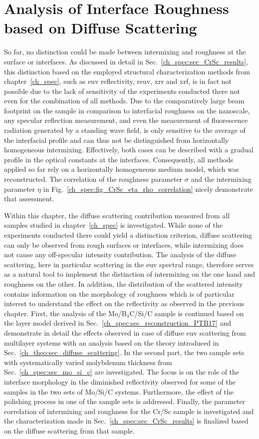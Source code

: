 \chapter{Analysis of Interface Roughness based on Diffuse Scattering} \label{ch_diff}
So far, no distinction could be made between intermixing and roughness at the surface or interfaces. As discussed in detail in Sec.~\ref{ch_spec:sec_CrSc_results}, this distinction based on the employed structural characterization methods from chapter~\ref{ch_spec}, such as \gls{euv} reflectivity, \gls{reuv}, \gls{xrr} and \gls{xrf}, is in fact not possible due to the lack of sensitivity of the experiments conducted there not even for the combination of all methods. Due to the comparatively large beam footprint on the sample in comparison to interfacial roughness on the nanoscale, any specular reflection measurement, and even the measurement of fluorescence radiation generated by a standing wave field, is only sensitive to the average of the interfacial profile and can thus not be distinguished from horizontally homogeneous intermixing. Effectively, both cases can be described with a gradual profile in the optical constants at the interfaces. Consequently, all methods applied so far rely on a horizontally homogeneous medium model, which was reconstructed. The correlation of the roughness parameter $\sigma$ and the intermixing parameter $\eta$ in Fig.~\ref{ch_spec:fig_CrSc_eta_rho_correlation} nicely demonstrate that assessment.

Within this chapter, the diffuse scattering contribution measured from all samples studied in chapter~\ref{ch_spec} is investigated. While none of the experiments conducted there could yield a distinction criterion, diffuse scattering can only be observed from rough surfaces or interfaces, while intermixing does not cause any off-specular intensity contribution. The analysis of the diffuse scattering, here in particular scattering in the \gls{euv} spectral range, therefore serves as a natural tool to implement the distinction of intermixing on the one hand and roughness on the other. In addition, the distribution of the scattered intensity contains information on the morphology of roughness which is of particular interest to understand the effect on the reflectivity as observed in the previous chapter. First, the analysis of the Mo/B$_4$C/Si/C sample is continued based on the layer model derived in Sec.~\ref{ch_spec:sec_reconstruction_PTB17} and demonstrate in detail the effects observed in case of diffuse \gls{euv} scattering from multilayer systems with an analysis based on the theory introduced in Sec.~\ref{ch_theo:sec_diffuse_scattering}. In the second part, the two sample sets with systematically varied molybdenum thickness from Sec.~\ref{ch_spec:sec_mo_si_c} are investigated. The focus is on the role of the interface morphology in the diminished reflectivity observed for some of the samples in the two sets of Mo/Si/C systems. Furthermore, the effect of the polishing process in one of the sample sets is addressed. Finally, the parameter correlation of intermixing and roughness for the Cr/Sc sample is investigated and the characterization made in Sec.~\ref{ch_spec:sec_CrSc_results} is finalized based on the diffuse scattering from that sample.


